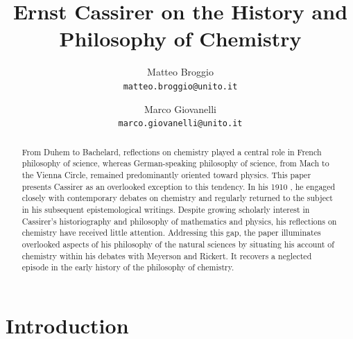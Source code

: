 \documentclass[submitted,12pt]{article}
\title{Ernst Cassirer on the History and Philosophy of Chemistry}
\author{\small
Matteo Broggio\\
  \texttt{matteo.broggio@unito.it}
  \and
\small  Marco Giovanelli\\
  \texttt{marco.giovanelli@unito.it}
}
\begin{document}
\maketitle


\begin{abstract}
From Duhem to Bachelard, reflections on chemistry played a central role in French philosophy of science, whereas German-speaking philosophy of science, from Mach to the Vienna Circle, remained predominantly oriented toward physics. This paper presents Cassirer as an overlooked exception to this tendency. In his 1910 \SFt, he engaged closely with contemporary debates on chemistry and regularly returned to the subject in his subsequent epistemological writings. Despite growing scholarly interest in Cassirer’s historiography and philosophy of mathematics and physics, his reflections on chemistry have received little attention. Addressing this gap, the paper illuminates overlooked aspects of his philosophy of the natural sciences by situating his account of chemistry within his debates with Meyerson and Rickert. It recovers a neglected episode in the early history of the philosophy of chemistry.
\end{abstract}

\section*{Introduction}
\end{document}
